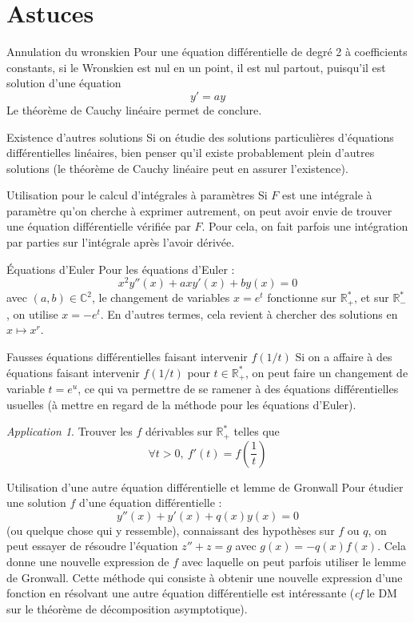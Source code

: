 \documentclass[french]{book}
\newcommand{\R}{\mathbb{R}}
\newcommand{\C}{\mathbb{C}}
\newcommand{\st}{^*}
\theoremstyle{plain}
\theoremstyle{definition}
\theoremstyle{remark}
\newtheorem*{app}{Application}
\begin{document}
\section{Astuces}
\begin{AS}{Annulation du wronskien} Pour une équation différentielle de degré 2 à coefficients constants, si le Wronskien est nul en un point, il est nul partout, puisqu’il est solution d’une équation $$y'=ay$$ Le théorème de Cauchy linéaire permet de conclure.
\end{AS}
\begin{AS}{Existence d'autres solutions} Si on étudie des solutions particulières d’équations différentielles linéaires, bien penser qu’il existe probablement plein d’autres solutions (le théorème de Cauchy linéaire peut en assurer l’existence).
\end{AS}
\begin{AS}{Utilisation pour le calcul d'intégrales à paramètres} Si $F$ est une intégrale à paramètre qu’on cherche à exprimer autrement, on peut avoir envie de trouver une équation différentielle vérifiée par $F$. Pour cela, on fait parfois une intégration par parties sur l’intégrale après l'avoir dérivée.
\end{AS}
\begin{AS}{Équations d'Euler} Pour les équations d’Euler : $$x^2y''(x)+axy'(x)+by(x)=0$$ avec $(a,b)\in\C^2$, le changement de variables $x=e^t$ fonctionne sur $\R_+\st$, et sur $\R_-\st$, on utilise $x=-e^t$. En d’autres termes, cela revient à chercher des solutions en $x\mapsto x^r$.
\end{AS}
\begin{AS}{Fausses équations différentielles faisant intervenir $f(1/t)$} Si on a affaire à des équations faisant intervenir $f(1/t)$ pour $t\in\R_+\st$, on peut faire un changement de variable $t=e^u$, ce qui va permettre de se ramener à des équations différentielles usuelles (à mettre en regard de la méthode pour les équations d'Euler).
\end{AS}
\begin{app}
	Trouver les $f$ dérivables sur $\R_+\st$ telles que $$\forall t>0,\ f'(t)=f\left(\frac{1}{t}\right)$$
\end{app}
\begin{AS}{Utilisation d'une autre équation différentielle et lemme de Gronwall} Pour étudier une solution $f$ d’une équation différentielle : $$y''(x) + y'(x) + q(x)y(x) = 0$$ (ou quelque chose qui y ressemble), connaissant des hypothèses sur $f$ ou $q$, on peut essayer de résoudre l’équation $z''+z=g$ avec $g(x)=-q(x)f(x)$. Cela donne une nouvelle expression de $f$ avec laquelle on peut parfois utiliser le lemme de Gronwall. Cette méthode qui consiste à obtenir une nouvelle expression d’une fonction en résolvant une autre équation différentielle est intéressante (\textit{cf} le DM sur le théorème de décomposition asymptotique).
\end{AS}
\end{document}

